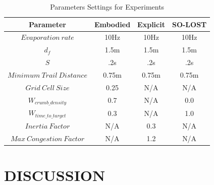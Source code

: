 \documentclass[letterpaper, 10 pt, conference]{ieeeconf}  %
\begin{document}
\begin{table}[ht]                                                              
  \begin{center}
    \begin{tabular}{|c|c|c|c|}                                                
    \hline
      Parameter & Embodied & Explicit & SO-LOST\\                                  
    \hline                                                                    
      $Evaporation\ rate$ & 10Hz & 10Hz & 10Hz\\ %
    \hline
      $d_f$ & 1.5m & 1.5m & 1.5m\\ %
    \hline
      $S$ & .2s & .2s & .2s\\ %
    \hline
      $Minimum\ Trail\ Distance$ & 0.75m & 0.75m & 0.75m\\ %
    \hline
      $Grid\ Cell\ Size$ & 0.25 & N/A & N/A\\ %
    \hline
      $W_{crumb\_density}$ & 0.7 & N/A & 0.0\\ %
    \hline
      $W_{time\_to\_target}$ & 0.3 & N/A & 1.0\\ %
    \hline
      $Inertia\ Factor$ & N/A & 0.3 & N/A\\ %
    \hline
      $Max\ Congestion\ Factor$ & N/A & 1.2 & N/A\\ %
    \hline
    \end{tabular}
   \caption{Parameters Settings for Experiments}                                
    \label{table:parameter_settings}
  \end{center}
\end{table}

\section{DISCUSSION}


\end{document}
